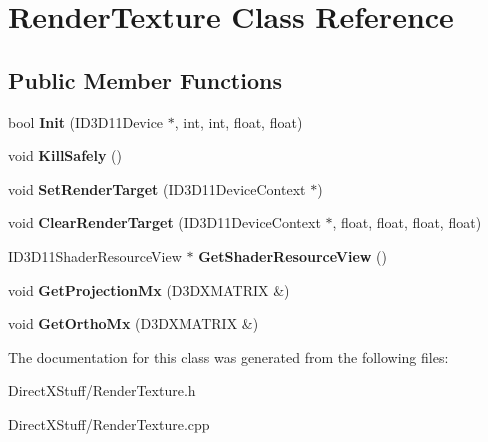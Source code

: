 \hypertarget{class_render_texture}{\section{Render\-Texture Class Reference}
\label{class_render_texture}
}
\subsection*{Public Member Functions}
\begin{DoxyCompactItemize}
\item 
\hypertarget{class_render_texture_ad80c390e1ac6c1ce7045a7f8ab06c0c4}{bool {\bfseries Init} (I\-D3\-D11\-Device $\ast$, int, int, float, float)}\label{class_render_texture_ad80c390e1ac6c1ce7045a7f8ab06c0c4}

\item 
\hypertarget{class_render_texture_afdc8c53c0dd693ef66a7ff513935921c}{void {\bfseries Kill\-Safely} ()}\label{class_render_texture_afdc8c53c0dd693ef66a7ff513935921c}

\item 
\hypertarget{class_render_texture_a7cde758403b94aff551845ed7a78dd97}{void {\bfseries Set\-Render\-Target} (I\-D3\-D11\-Device\-Context $\ast$)}\label{class_render_texture_a7cde758403b94aff551845ed7a78dd97}

\item 
\hypertarget{class_render_texture_af00748edeb8654853fef86014ebfc890}{void {\bfseries Clear\-Render\-Target} (I\-D3\-D11\-Device\-Context $\ast$, float, float, float, float)}\label{class_render_texture_af00748edeb8654853fef86014ebfc890}

\item 
\hypertarget{class_render_texture_afedeae5228096ead503ea904e732c718}{I\-D3\-D11\-Shader\-Resource\-View $\ast$ {\bfseries Get\-Shader\-Resource\-View} ()}\label{class_render_texture_afedeae5228096ead503ea904e732c718}

\item 
\hypertarget{class_render_texture_af10b1ac59984494c8a9ac2de4e670a45}{void {\bfseries Get\-Projection\-Mx} (D3\-D\-X\-M\-A\-T\-R\-I\-X \&)}\label{class_render_texture_af10b1ac59984494c8a9ac2de4e670a45}

\item 
\hypertarget{class_render_texture_a8c52735e5b5a4dc3cc6033eebe96ed8a}{void {\bfseries Get\-Ortho\-Mx} (D3\-D\-X\-M\-A\-T\-R\-I\-X \&)}\label{class_render_texture_a8c52735e5b5a4dc3cc6033eebe96ed8a}

\end{DoxyCompactItemize}


The documentation for this class was generated from the following files\-:\begin{DoxyCompactItemize}
\item 
Direct\-X\-Stuff/Render\-Texture.\-h\item 
Direct\-X\-Stuff/Render\-Texture.\-cpp\end{DoxyCompactItemize}
